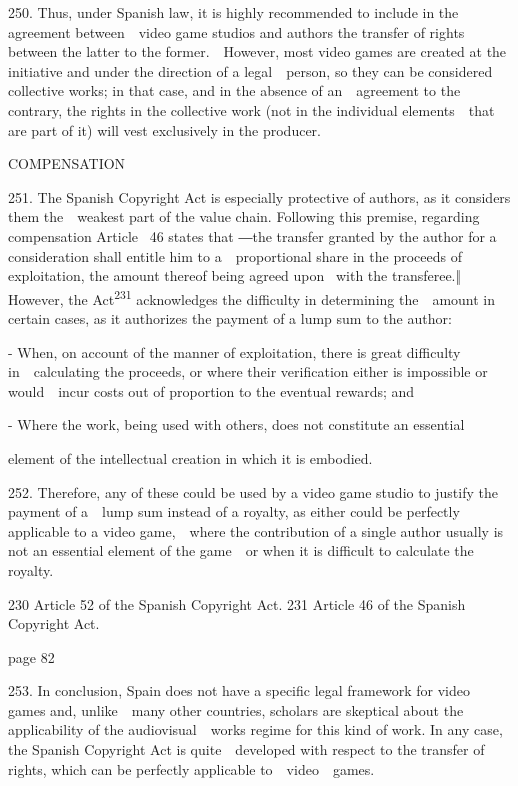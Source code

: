 \documentclass[
]{article}
\begin{document}
{250. }{Thus, under Spanish law, it is highly recommended to include in
the agreement between~~video game studios and authors the transfer of
rights between the latter to the former.~~However, most video games are
created at the initiative and under the direction of a legal~~person, so
they can be considered collective works; in that case, and in the
absence of an~~agreement to the contrary, the rights in the collective
work (not in the individual elements~~that are part of it) will vest
exclusively in the producer.}

{COMPENSATION}

{251. }{The Spanish }{Copyright Act }{is especially protective of
authors, as it considers them the~~weakest part of the value chain.
Following this premise, regarding compensation Article }{~46 states that
―}{the transfer granted by the author for a consideration shall entitle
him to a~~proportional share in the proceeds of exploitation, the amount
thereof being agreed upon }{~with the transferee.‖ }{However, the
Act}\textsuperscript{{231 }}{acknowledges the difficulty in determining
the~~amount in certain cases, as it authorizes the payment of a lump sum
to the author:}

{- }{When, on account of the manner of exploitation, there is great
difficulty in~~calculating the proceeds, or where their verification
either is impossible or would~~incur costs out of proportion to the
eventual rewards; and}

{- }{Where the work, being used with others, does not constitute an
essential}

{element of the intellectual creation in which it is embodied.}

{252. }{Therefore, any of these could be used by a video game studio to
justify the payment of a~~lump sum instead of a royalty, as either could
be perfectly applicable to a video game,~~where the contribution of a
single author usually is not an essential element of the game~~or when
it is difficult to calculate the royalty.}

{230 }{Article 52 of the Spanish }{Copyright Act}{. }{231 }{Article 46
of the Spanish }{Copyright Act}{.}

{page 82}

{253. }{In conclusion, Spain does not have a specific legal framework
for video games and, unlike~~many other countries, scholars are
skeptical about the applicability of the audiovisual~~works regime for
this kind of work. In any case, the Spanish }{Copyright Act }{is
quite~~developed with respect to the transfer of rights, which can be
perfectly applicable to~~video~~games.}
\end{document}
